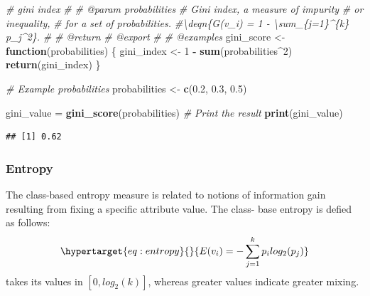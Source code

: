 \documentclass[a4paper,conference]{IEEEtran}
\newenvironment{Shaded}{\begin{snugshade}}{\end{snugshade}}
\newcommand{\CommentTok}[1]{\textcolor[rgb]{0.56,0.35,0.01}{\textit{#1}}}
\newcommand{\ControlFlowTok}[1]{\textcolor[rgb]{0.13,0.29,0.53}{\textbf{#1}}}
\newcommand{\DecValTok}[1]{\textcolor[rgb]{0.00,0.00,0.81}{#1}}
\newcommand{\FloatTok}[1]{\textcolor[rgb]{0.00,0.00,0.81}{#1}}
\newcommand{\FunctionTok}[1]{\textcolor[rgb]{0.13,0.29,0.53}{\textbf{#1}}}
\newcommand{\NormalTok}[1]{#1}
\newcommand{\OtherTok}[1]{\textcolor[rgb]{0.56,0.35,0.01}{#1}}
\newcommand{\SpecialCharTok}[1]{\textcolor[rgb]{0.81,0.36,0.00}{\textbf{#1}}}
\begin{document}
\begin{Shaded}
\begin{Highlighting}[]
\CommentTok{\#\textquotesingle{} gini index}
\CommentTok{\#\textquotesingle{}}
\CommentTok{\#\textquotesingle{} @param probabilities}
\CommentTok{\#\textquotesingle{} Gini index, a measure of impurity }
\CommentTok{\#\textquotesingle{} or inequality, }
\CommentTok{\#\textquotesingle{} for a set of probabilities.}
\CommentTok{\#\textquotesingle{}\textbackslash{}deqn\{G(v\_i) = 1 {-} \textbackslash{}sum\_\{j=1\}\^{}\{k\} p\_j\^{}2\}.}
\CommentTok{\#\textquotesingle{}}
\CommentTok{\#\textquotesingle{} @return}
\CommentTok{\#\textquotesingle{} @export}
\CommentTok{\#\textquotesingle{}}
\CommentTok{\#\textquotesingle{} @examples}
\NormalTok{gini\_score }\OtherTok{\textless{}{-}} \ControlFlowTok{function}\NormalTok{(probabilities) \{}
\NormalTok{  gini\_index }\OtherTok{\textless{}{-}} \DecValTok{1} \SpecialCharTok{{-}} \FunctionTok{sum}\NormalTok{(probabilities}\SpecialCharTok{\^{}}\DecValTok{2}\NormalTok{)}
  \FunctionTok{return}\NormalTok{(gini\_index)}
\NormalTok{\}}

\CommentTok{\# Example probabilities }
\NormalTok{probabilities }\OtherTok{\textless{}{-}} \FunctionTok{c}\NormalTok{(}\FloatTok{0.2}\NormalTok{, }\FloatTok{0.3}\NormalTok{, }\FloatTok{0.5}\NormalTok{)}

\NormalTok{gini\_value }\OtherTok{=} \FunctionTok{gini\_score}\NormalTok{(probabilities)}
\CommentTok{\# Print the result}
\FunctionTok{print}\NormalTok{(gini\_value)}
\end{Highlighting}
\end{Shaded}

\begin{verbatim}
## [1] 0.62
\end{verbatim}

\hypertarget{sec:entropy}{%
\subsubsection{Entropy}\label{sec:entropy}}

The class-based entropy measure is related to notions of information
gain resulting from fixing a specific attribute value. The class- base
entropy is defied as follows:
\begin{equation}\protect\hypertarget{eq:entropy}{}{ E(v_i) = - \sum_{j=1}^{k} p_ilog_2(p_j) }\end{equation}
takes its values in \([0,log_2(k)]\), whereas greater values indicate
greater mixing.
\end{document}
